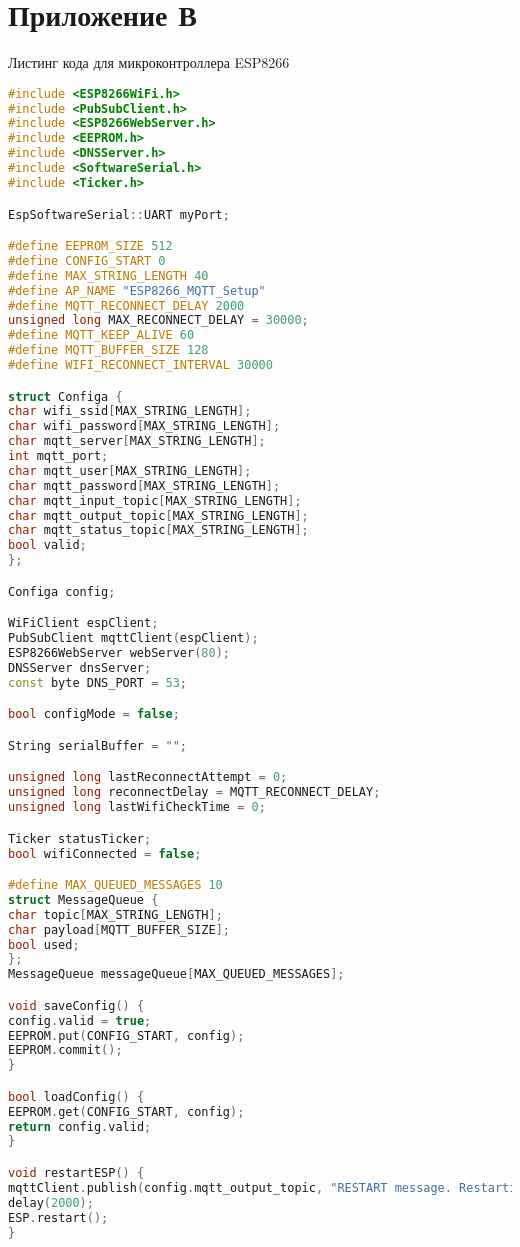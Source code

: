 \chapter{Приложение В}

Листинг кода для микроконтроллера ESP8266

\begin{lstlisting}[language=C++]
#include <ESP8266WiFi.h>
#include <PubSubClient.h>
#include <ESP8266WebServer.h>
#include <EEPROM.h>
#include <DNSServer.h>
#include <SoftwareSerial.h>
#include <Ticker.h>

EspSoftwareSerial::UART myPort;

#define EEPROM_SIZE 512
#define CONFIG_START 0
#define MAX_STRING_LENGTH 40
#define AP_NAME "ESP8266_MQTT_Setup"
#define MQTT_RECONNECT_DELAY 2000
unsigned long MAX_RECONNECT_DELAY = 30000;
#define MQTT_KEEP_ALIVE 60 
#define MQTT_BUFFER_SIZE 128
#define WIFI_RECONNECT_INTERVAL 30000

struct Configa {
char wifi_ssid[MAX_STRING_LENGTH];
char wifi_password[MAX_STRING_LENGTH];
char mqtt_server[MAX_STRING_LENGTH];
int mqtt_port;
char mqtt_user[MAX_STRING_LENGTH];
char mqtt_password[MAX_STRING_LENGTH];
char mqtt_input_topic[MAX_STRING_LENGTH];
char mqtt_output_topic[MAX_STRING_LENGTH];
char mqtt_status_topic[MAX_STRING_LENGTH];
bool valid;
};

Configa config;

WiFiClient espClient;
PubSubClient mqttClient(espClient);
ESP8266WebServer webServer(80);
DNSServer dnsServer;
const byte DNS_PORT = 53;

bool configMode = false;

String serialBuffer = "";

unsigned long lastReconnectAttempt = 0;
unsigned long reconnectDelay = MQTT_RECONNECT_DELAY;
unsigned long lastWifiCheckTime = 0;

Ticker statusTicker;
bool wifiConnected = false;

#define MAX_QUEUED_MESSAGES 10
struct MessageQueue {
char topic[MAX_STRING_LENGTH];
char payload[MQTT_BUFFER_SIZE];
bool used;
};
MessageQueue messageQueue[MAX_QUEUED_MESSAGES];

void saveConfig() {
config.valid = true;
EEPROM.put(CONFIG_START, config);
EEPROM.commit();
}

bool loadConfig() {
EEPROM.get(CONFIG_START, config);
return config.valid;
}

void restartESP() {
mqttClient.publish(config.mqtt_output_topic, "RESTART message. Restarting in 2 seconds...");
delay(2000);
ESP.restart();
}


\end{lstlisting}
